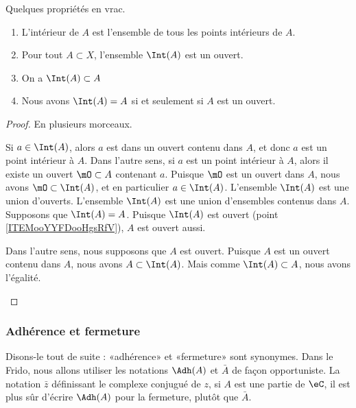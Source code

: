\begin{lemma}
	Quelques propriétés en vrac.
	\begin{enumerate}
		\item   \label{ITEMooHLIMooJEacKt}
		      L'intérieur de \( A\) est l'ensemble de tous les points intérieurs de \( A\).
		\item \label{ITEMooYTXSooMyiBpMgzK}
		      Pour tout \( A \subset X\), l'ensemble \( \Int(A)\) est un ouvert.
		\item   \label{ITEMooYYFDooHgsRfV}
		      On a  \( \Int(A) \subset A \)
		\item \label{ITEMooTDXFooFdyLeO}
		      Nous avons \( \Int(A) = A \) si et seulement si \( A\) est un ouvert.
	\end{enumerate}
\end{lemma}

\begin{proof}
	En plusieurs morceaux.
	\begin{subproof}
		\spitem[\ref{ITEMooHLIMooJEacKt}]
		Si \( a\in\Int(A)\), alors \( a\) est dans un ouvert contenu dans \( A\), et donc \( a\) est un point intérieur à \( A\). Dans l'autre sens, si \( a\) est un point intérieur à \( A\), alors il existe un ouvert \( \mO\subset A\) contenant \( a\). Puisque \( \mO\) est un ouvert dans \( A\), nous avons \( \mO\subset\Int(A)\), et en particulier \( a\in \Int(A)\).
		\spitem[\ref{ITEMooYTXSooMyiBpMgzK}]
		L'ensemble \( \Int(A)\) est une union d'ouverts.
		\spitem[\ref{ITEMooYYFDooHgsRfV}]
		L'ensemble \( \Int(A)\) est une union d'ensembles contenus dans \( A\).
		\spitem[\ref{ITEMooTDXFooFdyLeO}]
		Supposons que \( \Int(A)=A\). Puisque \( \Int(A)\) est ouvert (point \ref{ITEMooYYFDooHgsRfV}), \( A\) est ouvert aussi.

		Dans l'autre sens, nous supposons que \( A\) est ouvert. Puisque \( A\) est un ouvert contenu dans \( A\), nous avons \( A\subset\Int(A)\). Mais comme \( \Int(A)\subset A\), nous avons l'égalité.
	\end{subproof}
\end{proof}

\subsubsection{Adhérence et fermeture}

Disons-le tout de suite : «adhérence» et «fermeture» sont synonymes. Dans le Frido, nous allons utiliser les notations \( \Adh(A)\) et \( \bar A\) de façon opportuniste. La notation \( \bar z\) définissant le complexe conjugué de \( z\), si \( A\) est une partie de \( \eC\), il est plus sûr d'écrire \( \Adh(A)\) pour la fermeture, plutôt que \( \bar A\).

